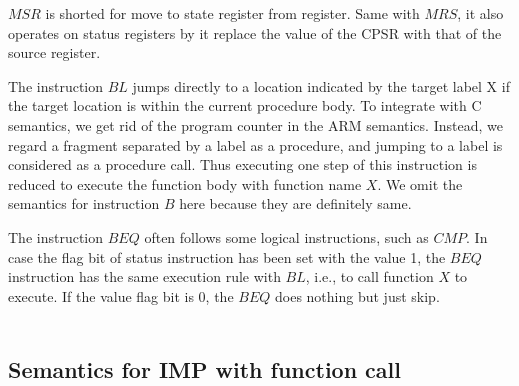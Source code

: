 \documentclass[letterpaper, 10 pt, conference]{IEEEtran}
\begin{document}
\par $MSR$ is shorted for move to state register from register. Same with $MRS$, it also operates on status registers by it replace the value of the CPSR with that of the source register.
\par The instruction $BL$ jumps directly to a location indicated by the target label X if the target location is within the current procedure body. To integrate with C semantics, we get rid of the program counter in the ARM semantics. Instead, we regard a fragment separated by a label as a procedure, and jumping to a label is considered as a procedure call. Thus executing one step of this instruction is reduced to execute the function body with function name $X$. We omit the semantics for instruction $B$ here because they are definitely same.

\par The instruction $BEQ$ often follows some logical instructions, such as $CMP$. In case the flag bit of status instruction has been set with the value 1, the $BEQ$ instruction has the same execution rule with $BL$, i.e., to call function $X$ to execute. If the value flag bit is 0, the $BEQ$ does nothing but just skip.\\\\

\subsection{Semantics for IMP with function call}
\end{document}
